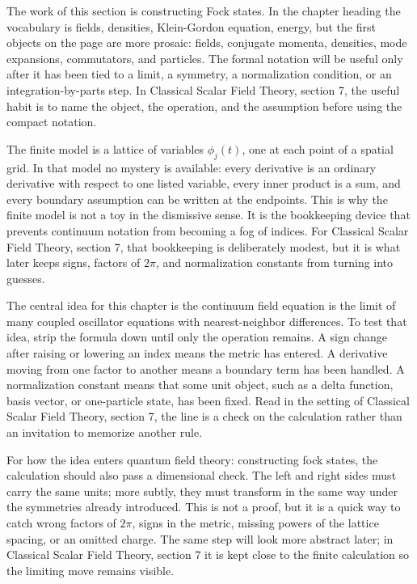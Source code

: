 The work of this section is constructing Fock states.  In the chapter heading the vocabulary is fields, densities, Klein-Gordon equation, energy, but the first objects on the page are more prosaic: fields, conjugate momenta, densities, mode expansions, commutators, and particles.  The formal notation will be useful only after it has been tied to a limit, a symmetry, a normalization condition, or an integration-by-parts step.  In Classical Scalar Field Theory, section 7, the useful habit is to name the object, the operation, and the assumption before using the compact notation.

The finite model is a lattice of variables \(\phi_j(t)\), one at each point of a spatial grid.  In that model no mystery is available: every derivative is an ordinary derivative with respect to one listed variable, every inner product is a sum, and every boundary assumption can be written at the endpoints.  This is why the finite model is not a toy in the dismissive sense.  It is the bookkeeping device that prevents continuum notation from becoming a fog of indices.  For Classical Scalar Field Theory, section 7, that bookkeeping is deliberately modest, but it is what later keeps signs, factors of \(2\pi\), and normalization constants from turning into guesses.

The central idea for this chapter is the continuum field equation is the limit of many coupled oscillator equations with nearest-neighbor differences.  To test that idea, strip the formula down until only the operation remains.  A sign change after raising or lowering an index means the metric has entered.  A derivative moving from one factor to another means a boundary term has been handled.  A normalization constant means that some unit object, such as a delta function, basis vector, or one-particle state, has been fixed.  Read in the setting of Classical Scalar Field Theory, section 7, the line is a check on the calculation rather than an invitation to memorize another rule.

For how the idea enters quantum field theory: constructing fock states, the calculation should also pass a dimensional check.  The left and right sides must carry the same units; more subtly, they must transform in the same way under the symmetries already introduced.  This is not a proof, but it is a quick way to catch wrong factors of \(2\pi\), signs in the metric, missing powers of the lattice spacing, or an omitted charge.  The same step will look more abstract later; in Classical Scalar Field Theory, section 7 it is kept close to the finite calculation so the limiting move remains visible.

